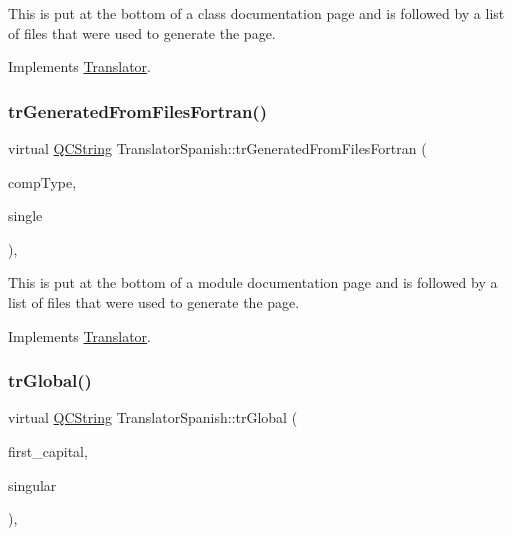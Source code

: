 This is put at the bottom of a class documentation page and is followed by a list of files that were used to generate the page. 

Implements \mbox{\hyperlink{class_translator}{Translator}}.

\mbox{\label{class_translator_spanish_ab2311a0179292882057d296322aee733}} 
\subsubsection{\texorpdfstring{trGeneratedFromFilesFortran()}{trGeneratedFromFilesFortran()}}
{\footnotesize\ttfamily virtual \mbox{\hyperlink{class_q_c_string}{Q\+C\+String}} Translator\+Spanish\+::tr\+Generated\+From\+Files\+Fortran (\begin{DoxyParamCaption}\item[{\mbox{\hyperlink{class_class_def_ae70cf86d35fe954a94c566fbcfc87939}{Class\+Def\+::\+Compound\+Type}}}]{comp\+Type,  }\item[{bool}]{single }\end{DoxyParamCaption})\hspace{0.3cm}{\ttfamily [inline]}, {\ttfamily [virtual]}}

This is put at the bottom of a module documentation page and is followed by a list of files that were used to generate the page. 

Implements \mbox{\hyperlink{class_translator}{Translator}}.

\mbox{\label{class_translator_spanish_a38769423776bd30cc397423fea823b74}} 
\subsubsection{\texorpdfstring{trGlobal()}{trGlobal()}}
{\footnotesize\ttfamily virtual \mbox{\hyperlink{class_q_c_string}{Q\+C\+String}} Translator\+Spanish\+::tr\+Global (\begin{DoxyParamCaption}\item[{bool}]{first\+\_\+capital,  }\item[{bool}]{singular }\end{DoxyParamCaption})\hspace{0.3cm}{\ttfamily [inline]}, {\ttfamily [virtual]}}

